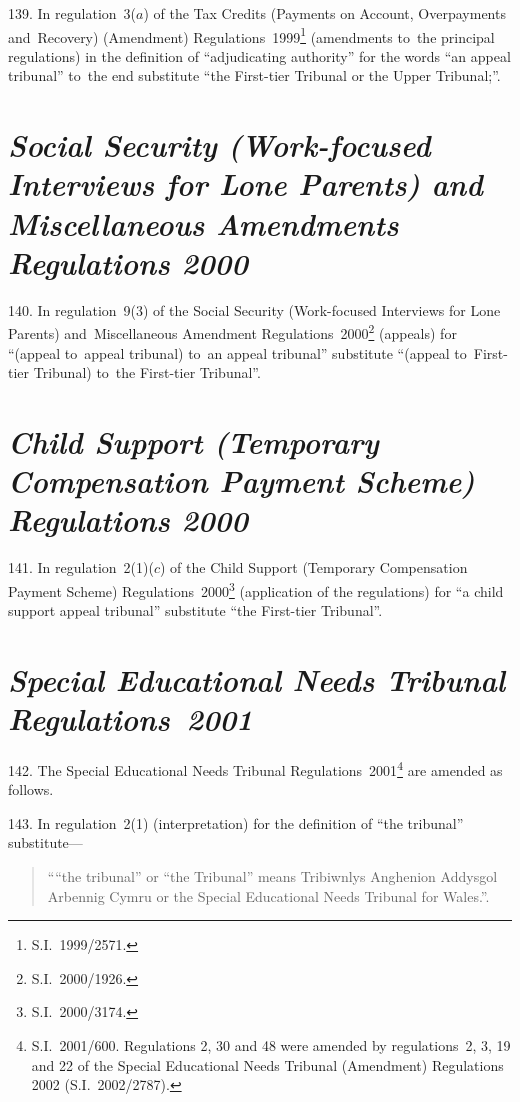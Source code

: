 \documentclass[12pt,a4paper]{article}
\begin{document}
139.  In regulation~3($a$)  of the Tax Credits (Payments on Account, Overpayments and~Recovery) (Amendment) Regulations~1999\footnote{S.I.~1999/2571.} (amendments to~the principal regulations) in the definition of “adjudicating authority” for the words “an appeal tribunal” to~the end substitute “the First-tier Tribunal or the Upper Tribunal;”.

\section*{\itshape\sloppy Social Security (Work-focused Interviews for Lone Parents) and Miscellaneous Amendments Regulations 2000}

140.  In regulation~9(3) of the Social Security (Work-focused Interviews for Lone Parents) and~Miscellaneous Amendment Regulations~2000\footnote{S.I.~2000/1926.} (appeals) for “(appeal to~appeal tribunal) to~an appeal tribunal” substitute “(appeal to~First-tier Tribunal) to~the First-tier Tribunal”.

\section*{\itshape\sloppy{} Child Support (Temporary Compensation Payment Scheme) Regulations 2000}

141.  In regulation~2(1)($c$)  of the Child Support (Temporary Compensation Payment Scheme) Regulations~2000\footnote{S.I.~2000/3174.} (application of the regulations) for “a child support appeal tribunal” substitute “the First-tier Tribunal”.

\section*{\itshape Special Educational Needs Tribunal Regulations~2001}

142.  The Special Educational Needs Tribunal Regulations~2001\footnote{S.I.~2001/600. Regulations 2, 30 and 48 were amended by regulations~2, 3, 19 and 22 of the Special Educational Needs Tribunal (Amendment) Regulations 2002 (S.I.~2002/2787).} are amended as follows.

\medskip

143.  In regulation~2(1) (interpretation) for the definition of “the tribunal” substitute—
\begin{quotation}
““the tribunal” or “the Tribunal” means {Tribiwnlys Anghenion Addysgol Arbennig Cymru} or the Special Educational Needs Tribunal for Wales.”.
\end{quotation}
\end{document}
